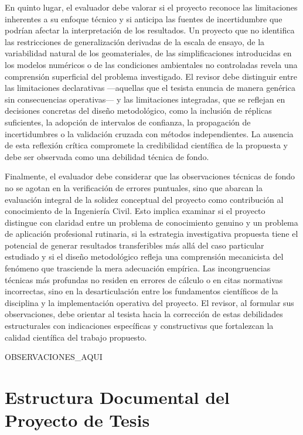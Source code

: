 \documentclass[12pt,a4paper]{report}
\begin{document}
En quinto lugar, el evaluador debe valorar si el proyecto reconoce las limitaciones inherentes a su enfoque técnico y si anticipa las fuentes de incertidumbre que podrían afectar la interpretación de los resultados. Un proyecto que no identifica las restricciones de generalización derivadas de la escala de ensayo, de la variabilidad natural de los geomateriales, de las simplificaciones introducidas en los modelos numéricos o de las condiciones ambientales no controladas revela una comprensión superficial del problema investigado. El revisor debe distinguir entre las limitaciones declarativas —aquellas que el tesista enuncia de manera genérica sin consecuencias operativas— y las limitaciones integradas, que se reflejan en decisiones concretas del diseño metodológico, como la inclusión de réplicas suficientes, la adopción de intervalos de confianza, la propagación de incertidumbres o la validación cruzada con métodos independientes. La ausencia de esta reflexión crítica compromete la credibilidad científica de la propuesta y debe ser observada como una debilidad técnica de fondo.

Finalmente, el evaluador debe considerar que las observaciones técnicas de fondo no se agotan en la verificación de errores puntuales, sino que abarcan la evaluación integral de la solidez conceptual del proyecto como contribución al conocimiento de la Ingeniería Civil. Esto implica examinar si el proyecto distingue con claridad entre un problema de conocimiento genuino y un problema de aplicación profesional rutinaria, si la estrategia investigativa propuesta tiene el potencial de generar resultados transferibles más allá del caso particular estudiado y si el diseño metodológico refleja una comprensión mecanicista del fenómeno que trasciende la mera adecuación empírica. Las incongruencias técnicas más profundas no residen en errores de cálculo o en citas normativas incorrectas, sino en la desarticulación entre los fundamentos científicos de la disciplina y la implementación operativa del proyecto. El revisor, al formular sus observaciones, debe orientar al tesista hacia la corrección de estas debilidades estructurales con indicaciones específicas y constructivas que fortalezcan la calidad científica del trabajo propuesto.


{{OBSERVACIONES_AQUI}}


\section{Estructura Documental del Proyecto de Tesis}
\end{document}

